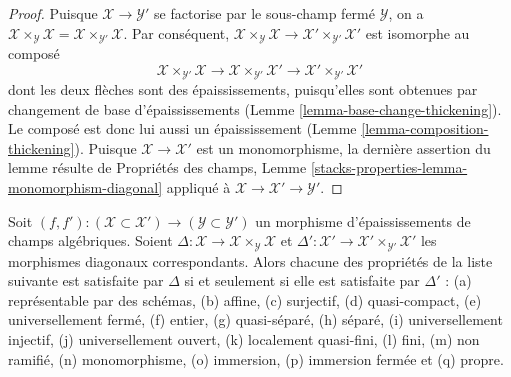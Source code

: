 \begin{proof}
Puisque $\mathcal{X} \to \mathcal{Y}'$ se factorise par le
sous-champ fermé $\mathcal{Y}$, on a
$\mathcal{X} \times_\mathcal{Y} \mathcal{X} =
\mathcal{X} \times_{\mathcal{Y}'} \mathcal{X}$.
Par conséquent,
$\mathcal{X} \times_\mathcal{Y} \mathcal{X} \to
\mathcal{X}' \times_{\mathcal{Y}'} \mathcal{X}'$
est isomorphe au composé
$$
\mathcal{X} \times_{\mathcal{Y}'} \mathcal{X} \to
\mathcal{X} \times_{\mathcal{Y}'} \mathcal{X}' \to
\mathcal{X}' \times_{\mathcal{Y}'} \mathcal{X}'
$$
dont les deux flèches sont des épaississements, puisqu'elles sont obtenues par changement de base
d'épaississements (Lemme \ref{lemma-base-change-thickening}).
Le composé est donc lui aussi un épaississement
(Lemme \ref{lemma-composition-thickening}).
Puisque $\mathcal{X} \to \mathcal{X}'$ est un monomorphisme,
la dernière assertion du lemme résulte de
Propriétés des champs, Lemme
\ref{stacks-properties-lemma-monomorphism-diagonal}
appliqué à $\mathcal{X} \to \mathcal{X}' \to \mathcal{Y}'$.
\end{proof}

\begin{lemma}
\label{lemma-thickening-diagonals}
Soit $(f, f') : (\mathcal{X} \subset \mathcal{X}') \to
(\mathcal{Y} \subset \mathcal{Y}')$ un morphisme d'épaississements
de champs algébriques.
Soient $\Delta : \mathcal{X} \to \mathcal{X} \times_\mathcal{Y} \mathcal{X}$ et
$\Delta' : \mathcal{X}' \to \mathcal{X}' \times_{\mathcal{Y}'} \mathcal{X}'$
les morphismes diagonaux correspondants.
Alors chacune des propriétés de la liste suivante est satisfaite par $\Delta$ si
et seulement si elle est satisfaite par $\Delta'$ :
(a) représentable par des schémas, (b) affine, (c) surjectif, (d) quasi-compact,
(e) universellement fermé, (f) entier, (g) quasi-séparé, (h) séparé,
(i) universellement injectif, (j) universellement ouvert, (k) localement quasi-fini,
(l) fini, (m) non ramifié, (n) monomorphisme, (o) immersion,
(p) immersion fermée et (q) propre.
\end{lemma}

